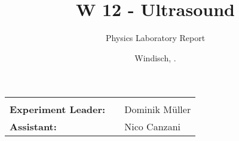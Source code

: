 \documentclass[final]{header/fhnwreport}
\title{\textbf{{\Huge W 12 - Ultrasound}}}
\author{{\Huge Physics Laboratory Report}}
\date{{\LARGE Windisch, \the\day.\MONTH \the\year}}
\begin{document}


\maketitle
\vfill
\begin{LARGE}
	\begin{tabularx}{\textwidth}{l p{0cm} X}
		\hline
		& & \\
		\textbf{Experiment Leader:} & & Dominik Müller \\
		\textbf{Assistant:} & & Nico Canzani \\
	\end{tabularx}
\end{LARGE}
\clearpage

\tableofcontents
\clearpage







\printbibliography[heading=bibintoc]
\label{sec:literature}




\ifdraft{
	\newpage
	\listoftodos[\section{To-Do}]
	\clearpage
}
{
}
\end{document}
